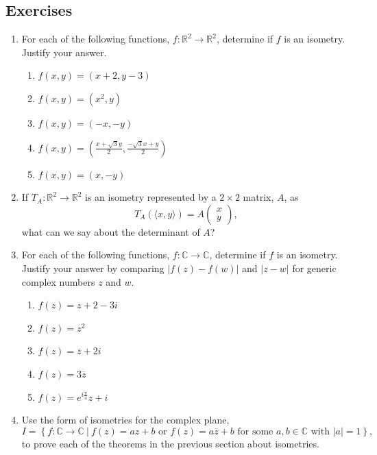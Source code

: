 \documentclass[
]{book}
\providecommand{\tightlist}{%
  \setlength{\itemsep}{0pt}\setlength{\parskip}{0pt}}
\theoremstyle{definition}
\theoremstyle{definition}
\theoremstyle{definition}
\theoremstyle{definition}
\theoremstyle{remark}
\begin{document}
\hypertarget{exercises-52}{%
\subsection{Exercises}\label{exercises-52}}

\begin{enumerate}
\def\labelenumi{\arabic{enumi}.}
\item
  For each of the following functions, \(f:\mathbb{R}^2 \rightarrow \mathbb{R}^2\), determine if \(f\) is an isometry. Justify your answer.

  \begin{enumerate}
  \def\labelenumii{\alph{enumii}.}
  \tightlist
  \item
    \(f(x,y)= (x+2,y-3)\)
  \item
    \(f(x,y)=(x^2,y)\)
  \item
    \(f(x,y)=(-x,-y)\)
  \item
    \(\displaystyle{f(x,y)=\left( \frac{x+\sqrt{3}y}{2}, \frac{-\sqrt{3}x+y}{2}\right) }\)
  \item
    \(f(x,y)=(x,-y)\)
  \end{enumerate}
\item
  If \(T_A:\mathbb{R}^2\rightarrow \mathbb{R}^2\) is an isometry represented by a \(2\times 2\) matrix, \(A\), as \[T_A\left(\langle x,y\rangle \right) = A\begin{pmatrix} x \\ y \end{pmatrix},\] what can we say about the determinant of \(A\)?
\item
  For each of the following functions, \(f:\mathbb{C} \rightarrow \mathbb{C}\), determine if \(f\) is an isometry. Justify your answer by comparing \(|f(z)-f(w)|\) and \(|z-w|\) for generic complex numbers \(z\) and \(w\).

  \begin{enumerate}
  \def\labelenumii{\alph{enumii}.}
  \tightlist
  \item
    \(f(z)=z+2-3i\)
  \item
    \(f(z)=z^2\)
  \item
    \(f(z) = \overline{z}+2i\)
  \item
    \(f(z)= 3 \overline{z}\)
  \item
    \(\displaystyle{f(z)= e^{i\frac{\pi}{4}} z +i}\)
  \end{enumerate}
\item
  Use the form of isometries for the complex plane, \[I = \left\{ f: \mathbb{C} \rightarrow \mathbb{C} \:\vert \: f(z)=a z+b \mbox{ or } f(z)=a \overline{z}+b \mbox{ for some } a, b \in \mathbb{C} \mbox{ with } |a|=1 \right\},\]
  to prove each of the theorems in the previous section about isometries.


\end{enumerate}
\end{document}
